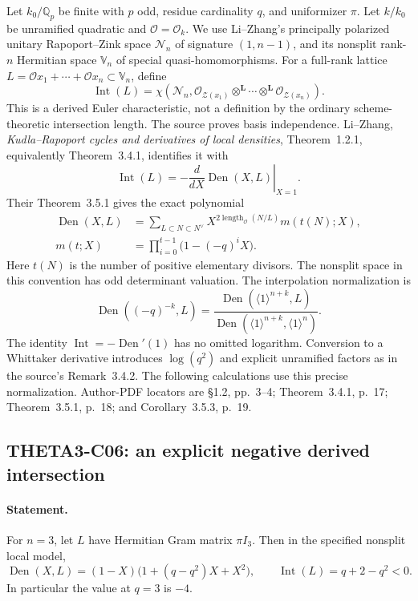 \documentclass[11pt]{article}
\newcommand{\Q}{\mathbb Q}\newcommand{\C}{\mathbb C}\newcommand{\Z}{\mathbb Z}\newcommand{\R}{\mathbb R}\newcommand{\A}{\mathbb A}\newcommand{\OO}{\mathcal O}
\theoremstyle{definition}\newtheorem{definition}[theorem]{Definition}\newtheorem{remark}[theorem]{Remark}
\begin{document}
Let $k_0/\Q_p$ be finite with $p$ odd, residue cardinality $q$, and
uniformizer $\pi$. Let $k/k_0$ be unramified quadratic and
$\mathcal O=\mathcal O_k$. We use Li--Zhang's principally polarized
unitary Rapoport--Zink space $\mathcal N_n$ of signature $(1,n-1)$,
and its nonsplit rank-$n$ Hermitian space $\mathbb V_n$ of special
quasi-homomorphisms. For a full-rank lattice
$L=\mathcal O x_1+\cdots+\mathcal O x_n\subset\mathbb V_n$, define
\[
 \operatorname{Int}(L)=\chi\left(\mathcal N_n,
  \mathcal O_{\mathcal Z(x_1)}\otimes^{\mathbf L}\cdots
                    \otimes^{\mathbf L}\mathcal O_{\mathcal Z(x_n)}\right).
\]
This is a derived Euler characteristic, not a definition by the
ordinary scheme-theoretic intersection length. The source proves
basis independence. Li--Zhang, \emph{Kudla--Rapoport cycles and
derivatives of local densities}, Theorem~1.2.1, equivalently
Theorem~3.4.1, identifies it with
\[
 \operatorname{Int}(L)=-\left.\frac{d}{dX}
                           \operatorname{Den}(X,L)\right|_{X=1}.
\]
Their Theorem~3.5.1 gives the exact polynomial
\begin{align*}
 \operatorname{Den}(X,L)
 &=\sum_{L\subset N\subset N^\vee}
      X^{2\operatorname{length}_{\mathcal O}(N/L)}m(t(N);X),\\
 m(t;X)&=\prod_{i=0}^{t-1}\bigl(1-(-q)^iX\bigr).
\end{align*}
Here $t(N)$ is the number of positive elementary divisors. The
nonsplit space in this convention has odd determinant valuation.
The interpolation normalization is
\[
 \operatorname{Den}((-q)^{-k},L)
 =\frac{\operatorname{Den}(\langle1\rangle^{n+k},L)}
        {\operatorname{Den}(\langle1\rangle^{n+k},\langle1\rangle^n)}.
\]
The identity $\operatorname{Int}=-\operatorname{Den}'(1)$ has no
omitted logarithm. Conversion to a Whittaker derivative introduces
$\log(q^2)$ and explicit unramified factors as in the source's
Remark~3.4.2. The following calculations use this precise
normalization. Author-PDF locators are \S1.2, pp.~3--4;
Theorem~3.4.1, p.~17; Theorem~3.5.1, p.~18; and
Corollary~3.5.3, p.~19.

\subsection{THETA3-C06: an explicit negative derived intersection}\label{C06}

\paragraph{Statement.}
For $n=3$, let $L$ have Hermitian Gram matrix $\pi I_3$.
Then in the specified nonsplit local model,
\[
 \operatorname{Den}(X,L)=(1-X)\bigl(1+(q-q^2)X+X^2\bigr),
 \qquad \operatorname{Int}(L)=q+2-q^2<0.
\]
In particular the value at $q=3$ is $-4$.
\end{document}
